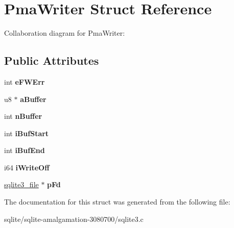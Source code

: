 \hypertarget{struct_pma_writer}{\section{Pma\+Writer Struct Reference}
\label{struct_pma_writer}
}


Collaboration diagram for Pma\+Writer\+:
\subsection*{Public Attributes}
\begin{DoxyCompactItemize}
\item 
\hypertarget{struct_pma_writer_a3d74aff37c8abafd22ec8f8159d08725}{int {\bfseries e\+F\+W\+Err}}\label{struct_pma_writer_a3d74aff37c8abafd22ec8f8159d08725}

\item 
\hypertarget{struct_pma_writer_ae53ada27501eb89a45409db4776f3b23}{u8 $\ast$ {\bfseries a\+Buffer}}\label{struct_pma_writer_ae53ada27501eb89a45409db4776f3b23}

\item 
\hypertarget{struct_pma_writer_a5d8e651696b33ff6318e7d8473ee9e1b}{int {\bfseries n\+Buffer}}\label{struct_pma_writer_a5d8e651696b33ff6318e7d8473ee9e1b}

\item 
\hypertarget{struct_pma_writer_ae77a80d66a5f3d40cd5d57861a455281}{int {\bfseries i\+Buf\+Start}}\label{struct_pma_writer_ae77a80d66a5f3d40cd5d57861a455281}

\item 
\hypertarget{struct_pma_writer_ab15d816e53fb4496dd1e59094d4839a6}{int {\bfseries i\+Buf\+End}}\label{struct_pma_writer_ab15d816e53fb4496dd1e59094d4839a6}

\item 
\hypertarget{struct_pma_writer_ad45a9271cbcdd0e506b81b77d2a744a5}{i64 {\bfseries i\+Write\+Off}}\label{struct_pma_writer_ad45a9271cbcdd0e506b81b77d2a744a5}

\item 
\hypertarget{struct_pma_writer_a54606c98fb9e7318a55ed59de0e55550}{\hyperlink{structsqlite3__file}{sqlite3\+\_\+file} $\ast$ {\bfseries p\+Fd}}\label{struct_pma_writer_a54606c98fb9e7318a55ed59de0e55550}

\end{DoxyCompactItemize}


The documentation for this struct was generated from the following file\+:\begin{DoxyCompactItemize}
\item 
sqlite/sqlite-\/amalgamation-\/3080700/sqlite3.\+c\end{DoxyCompactItemize}
